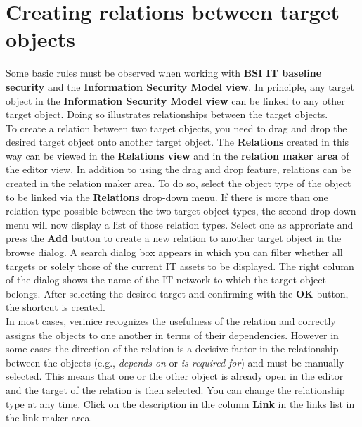 \documentclass[a4paper,10pt]{book}
\begin{document}
\section{Creating relations between target objects}
\label{sec:bsiView_dd}
Some basic rules must be observed when working with \textbf{BSI IT
  baseline security} and the \textbf{Information Security Model view}.
In principle, any target object in the \textbf{Information Security
  Model view} can be linked to any other target object.  Doing so
illustrates relationships between the target objects.
\newline\\
To create a relation between two target objects, you need to drag and
drop the desired target object onto another target object.  The
\textbf{Relations} created in this way can be viewed in the
\textbf{Relations view} and in the \textbf{relation maker area} of the
editor view.  In addition to using the drag and drop feature,
relations can be created in the relation maker area.  To do so, select
the object type of the object to be linked via the \textbf{Relations}
drop-down menu. If there is more than one relation type possible
between the two target object types, the second drop-down menu will
now display a list of those relation types. Select one as approriate
and press the \textbf{Add} button to create a new relation to another
target object in the browse dialog.  A search dialog box appears in
which you can filter whether all targets or solely those of the
current IT assets to be displayed.  The right column of the dialog
shows the name of the IT network to which the target object belongs.
After selecting the desired target and confirming with the \textbf{OK}
button, the shortcut is created.
\newline\\
In most cases, verinice recognizes the usefulness of the relation and
correctly assigns the objects to one another in terms of their
dependencies.  However in some cases the direction of the relation is
a decisive factor in the relationship between the objects (e.g., {\em
  depends on} or {\em is required for}) and must be manually selected.
This means that one or the other object is already open in the editor
and the target of the relation is then selected.  You can change the
relationship type at any time.  Click on the description in the column
\textbf{Link} in the links list in the link maker area.
\end{document}
